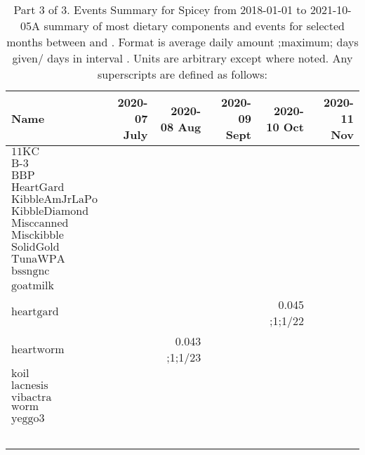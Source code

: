\begin{table}[H]
\centering
\begin{tabular}{|l|r|r|r|r|r|}
\hline
Name&2020-07 July&2020-08 Aug&2020-09 Sept&2020-10 Oct&2020-11 Nov\\
\hline
$\textrm{11KC}$&&&&&\\
$\textrm{B-3}$&&&&&\\
$\textrm{BBP}$&&&&&\\
$\textrm{HeartGard}$&&&&&\\
$\textrm{KibbleAmJrLaPo}$&&&&&\\
$\textrm{KibbleDiamond}$&&&&&\\
$\textrm{Misccanned}$&&&&&\\
$\textrm{Misckibble}$&&&&&\\
$\textrm{SolidGold}$&&&&&\\
$\textrm{TunaWPA}$&&&&&\\
$\textrm{bssngnc}$&&&&&\\
$\textrm{goatmilk}$&&&&&\\
$\textrm{heartgard}$&&&&0.045 ;1;1/22&\\
$\textrm{heartworm}$&&0.043 ;1;1/23&&&\\
$\textrm{koil}$&&&&&\\
$\textrm{lacnesis}$&&&&&\\
$\textrm{vibactra}$&&&&&\\
$\textrm{worm}$&&&&&\\
$\textrm{yeggo3}$&&&&&\\
&&&&&\\
&&&&&\\
&&&&&\\
&&&&&\\
&&&&&\\
\hline
\end{tabular}
\caption{Part 3 of 3.  Events Summary for Spicey   from 2018-01-01 to 2021-10-05A summary of most dietary components and events  for selected months between \mjmdatemin and \mjmdatemax. Format is average daily amount ;maximum; days given/ days in interval . Units are arbitrary except where noted. Any  superscripts are defined as follows:  \mjmsuperscripts}
\end{table}

